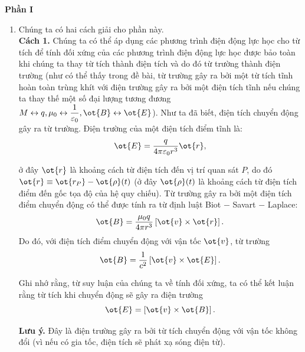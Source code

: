 \begin{loigiai}
  \begin{center}
     \textbf{Phần I}
   \end{center}
 \begin{enumerate}[1)]
   \item Chúng ta có hai cách giải cho phần này.\\
\textbf{Cách 1.} Chúng ta có thể áp dụng các phương trình điện động lực học cho từ tích để tính đối xứng của các phương trình điện động lực học được bảo toàn khi chúng ta thay từ tích thành điện tích và do đó từ trường thành điện trường (như có thể thấy trong đề bài, từ trường gây ra bởi một từ tích tĩnh hoàn toàn trùng khít với điện trường gây ra bởi một điện tích tĩnh nếu chúng ta thay thế một số đại lượng tương đương $M \leftrightarrow q, \mu_0 \leftrightarrow \dfrac{1}{\varepsilon_0}, \ot{B} \leftrightarrow \ot{E}$). Như ta đã biết, điện tích chuyển động gây ra từ trường. Điện trường của một điện tích điểm tĩnh là: 
    \[\ot{E} = \dfrac{q}{4\pi \varepsilon_0 r^3} \ot{r},\]

ở đây $\ot{r}$ là khoảng cách từ điện tích đến vị trí quan sát $P$, do đó $\ot{r} \equiv \ot{r_P} -\ot{\rho}(t)$ (ở đây $\ot{\rho}(t)$ là khoảng cách từ điện tích điểm đến gốc tọa độ của hệ quy chiếu). Từ trường gây ra bởi một điện tích điểm chuyển động có thể được tính ra từ định luật Biot $-$ Savart $-$ Laplace:
  \[ \ot{B} = \dfrac{\mu_0 q}{4\pi r^3} \left[\ot{v} \times \ot{r}\right].\]
Do đó, với điện tích điểm chuyển động với vận tốc $\ot{v}$, từ trường
    \[\ot{B} = \dfrac{1}{c^2} \left[\ot{v} \times \ot{E}\right].\]

Ghi nhớ rằng, từ suy luận của chúng ta về tính đối xứng, ta có thể kết luận rằng từ tích khi chuyển động sẽ gây ra điện trường
  \[\ot{E} = \left[\ot{v} \times \ot{B}\right].\]

\textbf{Lưu ý.} Đây là điện trường gây ra bởi từ tích chuyển động với vận tốc không đổi (vì nếu có gia tốc, điện tích sẽ phát xạ sóng điện từ).
\begin{center}



\begin{tikzpicture}[x=0.75pt,y=0.75pt,yscale=-1,xscale=1]


\end{tikzpicture}
\end{center}
\end{enumerate}
\end{loigiai}
